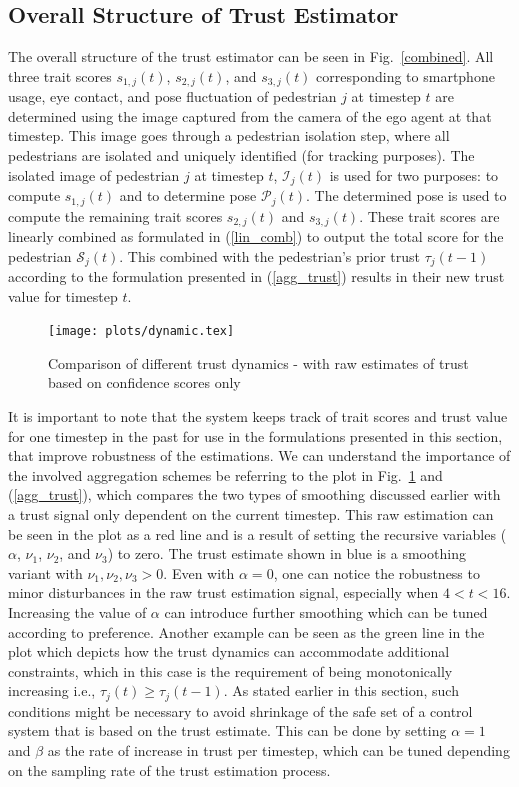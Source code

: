 \documentclass[journal]{IEEEtran}
\begin{document}
\subsection{Overall Structure of Trust Estimator}
The overall structure of the trust estimator can be seen in Fig.~\ref{combined}. All three trait scores $s_{1, j}(t)$, $s_{2, j}(t)$, and $s_{3, j}(t)$ corresponding to smartphone usage, eye contact, and pose fluctuation of pedestrian $j$ at timestep $t$ are determined using the image captured from the camera of the ego agent at that timestep. This image goes through a pedestrian isolation step, where all pedestrians are isolated and uniquely identified (for tracking purposes). The isolated image of pedestrian $j$ at timestep $t$, $\mathcal{I}_j(t)$ is used for two purposes: to compute $s_{1, j}(t)$ and to determine pose $\mathcal{P}_j(t)$. The determined pose is used to compute the remaining trait scores $s_{2, j}(t)$ and $s_{3, j}(t)$. These trait scores are linearly combined as formulated in (\ref{lin_comb}) to output the total score for the pedestrian $\mathcal{S}_j(t)$. This combined with the pedestrian's prior trust $\tau_j(t-1)$ according to the formulation presented in (\ref{agg_trust}) results in their new trust value for timestep $t$.

\begin{figure}
  \centering
  \texttt{[image: plots/dynamic.tex]}
  \caption{Comparison of different trust dynamics - with raw estimates of trust based on confidence scores only}
  \label{dynamic}
\end{figure}

It is important to note that the system keeps track of trait scores and trust value for one timestep in the past for use in the formulations presented in this section, that improve robustness of the estimations. We can understand the importance of the involved aggregation schemes be referring to the plot in Fig.~\ref{dynamic} and (\ref{agg_trust}), which compares the two types of smoothing discussed earlier with a trust signal only dependent on the current timestep. This raw estimation can be seen in the plot as a red line and is a result of setting the recursive variables ($\alpha$, $\nu_1$, $\nu_2$, and $\nu_3$) to zero. The trust estimate shown in blue is a smoothing variant with $\nu_1, \nu_2, \nu_3 > 0$. Even with $\alpha=0$, one can notice the robustness to minor disturbances in the raw trust estimation signal, especially when $4 < t < 16$. Increasing the value of $\alpha$ can introduce further smoothing which can be tuned according to preference. Another example can be seen as the green line in the plot which depicts how the trust dynamics can accommodate additional constraints, which in this case is the requirement of being monotonically increasing i.e., $\tau_j(t)\geq\tau_j(t-1)$. As stated earlier in this section, such conditions might be necessary to avoid shrinkage of the safe set of a control system that is based on the trust estimate. This can be done by setting $\alpha=1$ and $\beta$ as the rate of increase in trust per timestep, which can be tuned depending on the sampling rate of the trust estimation process.
\end{document}
